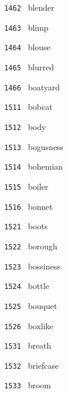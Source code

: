 \documentclass[11pt]{article}
\begin{document}
\begin{multicols}{6}
\noindent \texttt{ 1462 } \hspace{1mm} blender  \par
\noindent \texttt{ 1463 } \hspace{1mm} blimp  \par
\noindent \texttt{ 1464 } \hspace{1mm} blouse  \par
\noindent \texttt{ 1465 } \hspace{1mm} blurred  \par
\noindent \texttt{ 1466 } \hspace{1mm} boatyard  \par
\noindent \texttt{ 1511 } \hspace{1mm} bobcat  \par
\noindent \texttt{ 1512 } \hspace{1mm} body  \par
\noindent \texttt{ 1513 } \hspace{1mm} bogusness  \par
\noindent \texttt{ 1514 } \hspace{1mm} bohemian  \par
\noindent \texttt{ 1515 } \hspace{1mm} boiler  \par
\noindent \texttt{ 1516 } \hspace{1mm} bonnet  \par
\noindent \texttt{ 1521 } \hspace{1mm} boots  \par
\noindent \texttt{ 1522 } \hspace{1mm} borough  \par
\noindent \texttt{ 1523 } \hspace{1mm} bossiness  \par
\noindent \texttt{ 1524 } \hspace{1mm} bottle  \par
\noindent \texttt{ 1525 } \hspace{1mm} bouquet  \par
\noindent \texttt{ 1526 } \hspace{1mm} boxlike  \par
\noindent \texttt{ 1531 } \hspace{1mm} breath  \par
\noindent \texttt{ 1532 } \hspace{1mm} briefcase  \par
\noindent \texttt{ 1533 } \hspace{1mm} broom  \par

\end{multicols}
\end{document}
